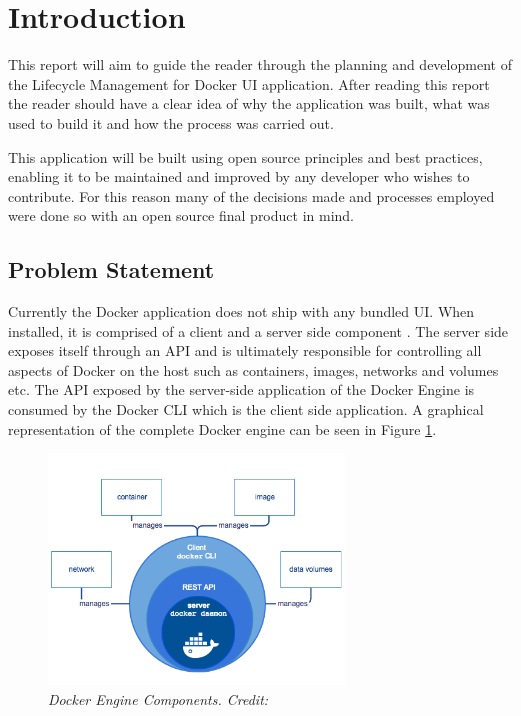 \section{Introduction}
\label{sec:intro}
This report will aim to guide the reader through the planning and development of the Lifecycle Management for Docker \gls{UI} application. After reading this report the reader should have a clear idea of why the application was built, what was used to build it and how the process was carried out.

This application will be built using open source principles and best practices, enabling it to be maintained and improved by any developer who wishes to contribute. For this reason many of the decisions made and processes employed were done so with an open source final product in mind.

\subsection{Problem Statement}
Currently the \gls{Docker} application does not ship with any bundled \gls{UI}. When installed, it is comprised of a client and a server side component \citep{Docker2017}. The server side exposes itself through an \gls{API} and is ultimately responsible for controlling all aspects of Docker on the host such as containers, images, networks and volumes etc. The API exposed by the server-side application of the Docker Engine is consumed by the Docker \gls{CLI} which is the client side application. A graphical representation of the complete Docker engine can be seen in Figure \ref{fig:docker_engine}.

\begin{figure}[!ht]
\centering
\includegraphics*[width=0.7\textwidth]{images/docker_engine}
\caption{\em Docker Engine Components. Credit: \citep{Docker2017}}
\label{fig:docker_engine}
\end{figure}

